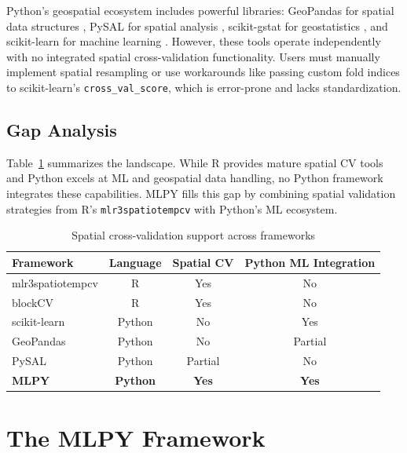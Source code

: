 \documentclass[review,12pt]{elsarticle}
\begin{document}
Python's geospatial ecosystem includes powerful libraries: GeoPandas for spatial data structures \citep{kelsey2020geopandas}, PySAL for spatial analysis \citep{rey2010pysal}, scikit-gstat for geostatistics \citep{malicke2021scikit}, and scikit-learn for machine learning \citep{pedregosa2011scikit}. However, these tools operate independently with no integrated spatial cross-validation functionality. Users must manually implement spatial resampling or use workarounds like passing custom fold indices to scikit-learn's \texttt{cross\_val\_score}, which is error-prone and lacks standardization.

\subsection{Gap Analysis}

Table~\ref{tab:gap} summarizes the landscape. While R provides mature spatial CV tools and Python excels at ML and geospatial data handling, no Python framework integrates these capabilities. MLPY fills this gap by combining spatial validation strategies from R's \texttt{mlr3spatiotempcv} with Python's ML ecosystem.

\begin{table}[ht]
\centering
\caption{Spatial cross-validation support across frameworks}
\label{tab:gap}
\begin{tabular}{lccc}
\toprule
Framework & Language & Spatial CV & Python ML Integration \\
\midrule
mlr3spatiotempcv & R & Yes & No \\
blockCV & R & Yes & No \\
scikit-learn & Python & No & Yes \\
GeoPandas & Python & No & Partial \\
PySAL & Python & Partial & No \\
\textbf{MLPY} & \textbf{Python} & \textbf{Yes} & \textbf{Yes} \\
\bottomrule
\end{tabular}
\end{table}


\section{The MLPY Framework}\label{sec:framework}
\end{document}
